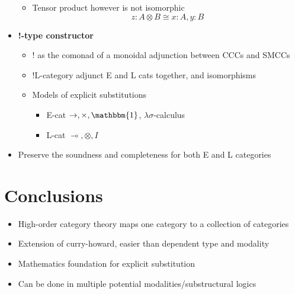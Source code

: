 \documentclass[11pt]{article}
\begin{document}
\begin{itemize}
\begin{itemize}
            \item Tensor product however is not isomorphic \[z: A \otimes B \cong x : A, y : B\]
        \end{itemize}
    \item \textbf{!-type constructor}        
        \begin{itemize}
            \item ! as the comonad of a monoidal adjunction between CCCs and SMCCs\cite{Benton1994LinearNonLinear}
            \item !L-category adjunct E and L cats together, and isomorphisms
            \item Models of explicit substitutions
                \begin{itemize}
                    \item E-cat $\to, \times, \mathbbm{1}$, $\lambda\sigma$-calculus
                    \item L-cat $\multimap, \otimes, I$
                \end{itemize}
        \end{itemize}
    \item Preserve the soundness and completeness for both E and L categories
\end{itemize}

\section{Conclusions}
\begin{itemize}
    \item High-order category theory maps one category to a collection of categories
    \item Extension of curry-howard, easier than dependent type and modality
    \item Mathematics foundation for explicit substitution
    \item Can be done in multiple potential modalities/substructural logics
\end{itemize}

\newpage
\printbibliography[heading=bibintoc]
\end{document}
